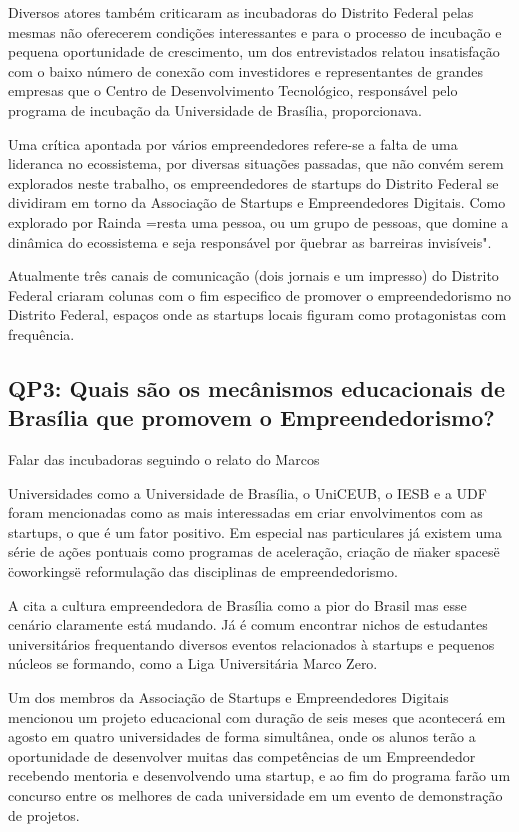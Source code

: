 Diversos atores também criticaram as incubadoras do Distrito Federal pelas mesmas não oferecerem condições interessantes e para o processo de incubação e pequena oportunidade de crescimento, um dos entrevistados relatou insatisfação com o baixo número de conexão com investidores e representantes de grandes empresas que o Centro de Desenvolvimento Tecnológico, responsável pelo programa de incubação da Universidade de Brasília, proporcionava.

Uma crítica apontada por vários empreendedores refere-se a falta de uma lideranca no ecossistema, por diversas situações passadas, que não convém serem explorados neste trabalho, os empreendedores de startups do Distrito Federal se dividiram em torno da Associação de Startups e Empreendedores Digitais. Como explorado por  Rainda =resta uma pessoa, ou um grupo de pessoas, que domine a dinâmica do ecossistema e seja responsável por \"quebrar as barreiras invisíveis".

Atualmente três canais de comunicação (dois jornais e um impresso) do Distrito Federal criaram colunas com o fim especifico de promover o empreendedorismo no Distrito Federal, espaços onde as startups locais figuram como protagonistas com frequência.


\subsection{QP3: Quais são os mecânismos educacionais de Brasília que promovem o Empreendedorismo?}
\label{subsection:pergunta_de_pesquisa_3}

Falar das incubadoras seguindo o relato do Marcos

Universidades como a Universidade de Brasília, o UniCEUB, o IESB e a UDF foram mencionadas como as mais interessadas em criar envolvimentos com as startups, o que é um fator positivo. Em especial nas particulares já existem uma série de ações pontuais como programas de aceleração, criação de \"maker spaces\" e \"coworkings\" e reformulação das disciplinas de empreendedorismo.

A  cita a cultura empreendedora de Brasília como a pior do Brasil mas esse cenário claramente está mudando. Já é comum encontrar nichos de estudantes universitários frequentando diversos eventos relacionados à startups e pequenos núcleos se formando, como a Liga Universitária Marco Zero. 

Um dos membros da Associação de Startups e Empreendedores Digitais mencionou um projeto educacional com duração de seis meses que acontecerá em agosto em quatro universidades de forma simultânea, onde os alunos terão a oportunidade de desenvolver muitas das competências de um Empreendedor recebendo mentoria e desenvolvendo uma startup, e ao fim do programa farão um concurso entre os melhores de cada universidade em um evento de demonstração de projetos.

